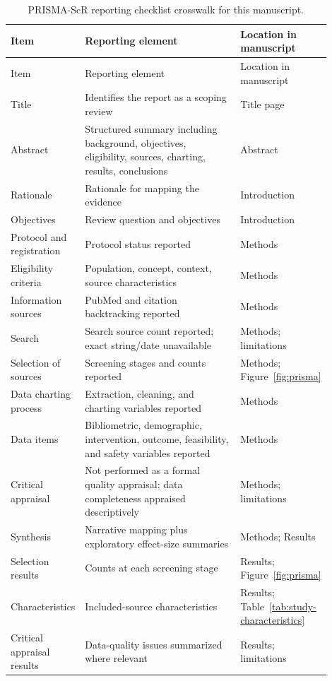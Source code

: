 \begin{longtable}{@{}p{0.18\linewidth}p{0.50\linewidth}p{0.22\linewidth}@{}}
\caption{PRISMA-ScR reporting checklist crosswalk for this manuscript.}
\label{tab:prisma-checklist}\\
\toprule
Item & Reporting element & Location in manuscript \\
\midrule
\endfirsthead
\toprule
Item & Reporting element & Location in manuscript \\
\midrule
\endhead
\bottomrule
\endfoot
Title & Identifies the report as a scoping review & Title page \\
Abstract & Structured summary including background, objectives, eligibility, sources, charting, results, conclusions & Abstract \\
Rationale & Rationale for mapping the evidence & Introduction \\
Objectives & Review question and objectives & Introduction \\
Protocol and registration & Protocol status reported & Methods \\
Eligibility criteria & Population, concept, context, source characteristics & Methods \\
Information sources & PubMed and citation backtracking reported & Methods \\
Search & Search source count reported; exact string/date unavailable & Methods; limitations \\
Selection of sources & Screening stages and counts reported & Methods; Figure~\ref{fig:prisma} \\
Data charting process & Extraction, cleaning, and charting variables reported & Methods \\
Data items & Bibliometric, demographic, intervention, outcome, feasibility, and safety variables reported & Methods \\
Critical appraisal & Not performed as a formal quality appraisal; data completeness appraised descriptively & Methods; limitations \\
Synthesis & Narrative mapping plus exploratory effect-size summaries & Methods; Results \\
Selection results & Counts at each screening stage & Results; Figure~\ref{fig:prisma} \\
Characteristics & Included-source characteristics & Results; Table~\ref{tab:study-characteristics} \\
Critical appraisal results & Data-quality issues summarized where relevant & Results; limitations \\

\end{longtable}
